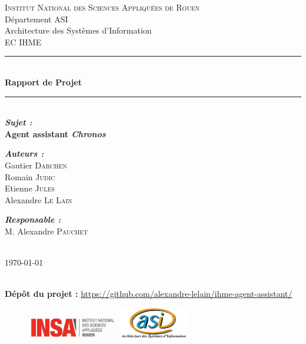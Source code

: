 \begin{titlepage}
\newcommand{\HRule}{\rule{\linewidth}{0.5mm}} 
\center 
{}\textsc{\huge Institut National des Sciences Appliquées de Rouen}\\[0.7cm] 
\LARGE Département ASI~\\[0.5cm]
\Large{Architecture des Systèmes d'Information} ~\\[1.5cm]
\textsc{\Large EC IHME}\\[1cm] 

\HRule \\[0.4cm]
{ \huge \bfseries Rapport de Projet}\\[0.2cm] \HRule \\[1.5cm]
 
\LARGE \emph{\textbf{Sujet :}} \\
\textbf{Agent assistant \emph{Chronos}}\\[2cm]

\large
\begin{minipage}[c]{.3\linewidth}
	\begin{flushleft}
       \emph{\textbf{Auteurs :}}\\
       Gautier \textsc{Darchen}\\
       Romain \textsc{Judic}\\
       Etienne \textsc{Jules}\\
        Alexandre \textsc{Le Lain}
        
	\end{flushleft}
   \end{minipage} \hfill
   \begin{minipage}[c]{.3\linewidth}
  	 \begin{flushright}
 	\emph{\textbf{Responsable :}}\\
		M. Alexandre \textsc{Pauchet}
	\end{flushright}
   \end{minipage}
   
~\\[1.5cm]

\vfill{\today} 

~\\[1.5cm]
\textbf{Dépôt du projet : } \url{https://github.com/alexandre-lelain/ihme-agent-assistant/}

\begin{figure}
\includegraphics[width=4cm]{images/LogoINSA.png}\hfill
\includegraphics[width=3cm]{images/logoasi.png}
\end{figure}


 \end{titlepage}
